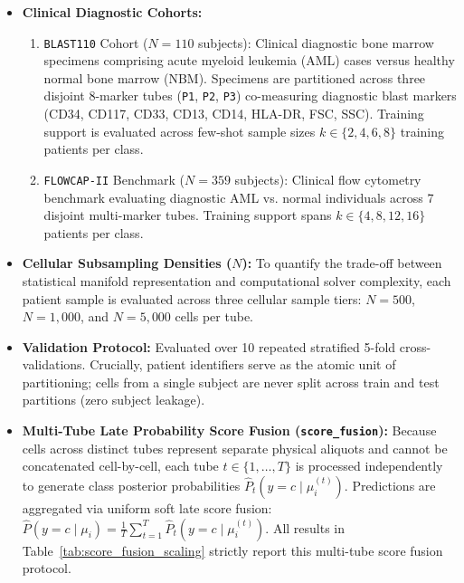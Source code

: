 \documentclass[10pt]{article}
\begin{document}
\begin{itemize}\setlength{\itemsep}{1pt}\setlength{\parskip}{0pt}
    \item \textbf{Clinical Diagnostic Cohorts:}
    \begin{enumerate}\setlength{\itemsep}{1pt}\setlength{\parskip}{0pt}
        \item \texttt{BLAST110} Cohort ($N=110$ subjects): Clinical diagnostic bone marrow specimens comprising acute myeloid leukemia (AML) cases versus healthy normal bone marrow (NBM). Specimens are partitioned across three disjoint 8-marker tubes (\texttt{P1}, \texttt{P2}, \texttt{P3}) co-measuring diagnostic blast markers (CD34, CD117, CD33, CD13, CD14, HLA-DR, FSC, SSC). Training support is evaluated across few-shot sample sizes $k \in \{2, 4, 6, 8\}$ training patients per class.
        \item \texttt{FLOWCAP-II} Benchmark ($N=359$ subjects): Clinical flow cytometry benchmark evaluating diagnostic AML vs. normal individuals across 7 disjoint multi-marker tubes. Training support spans $k \in \{4, 8, 12, 16\}$ patients per class.
    \end{enumerate}
    \item \textbf{Cellular Subsampling Densities ($N$):} To quantify the trade-off between statistical manifold representation and computational solver complexity, each patient sample is evaluated across three cellular sample tiers: $N = 500$, $N = 1{,}000$, and $N = 5{,}000$ cells per tube.
    \item \textbf{Validation Protocol:} Evaluated over 10 repeated stratified 5-fold cross-validations. Crucially, patient identifiers serve as the atomic unit of partitioning; cells from a single subject are never split across train and test partitions (zero subject leakage).
    \item \textbf{Multi-Tube Late Probability Score Fusion (\texttt{score\_fusion}):} Because cells across distinct tubes represent separate physical aliquots and cannot be concatenated cell-by-cell, each tube $t \in \{1, \dots, T\}$ is processed independently to generate class posterior probabilities $\hat{P}_t(y = c \mid \mu_i^{(t)})$. Predictions are aggregated via uniform soft late score fusion: $\hat{P}(y = c \mid \mu_i) = \frac{1}{T} \sum_{t=1}^T \hat{P}_t(y = c \mid \mu_i^{(t)})$. All results in Table~\ref{tab:score_fusion_scaling} strictly report this multi-tube score fusion protocol.
\end{itemize}

\end{document}
